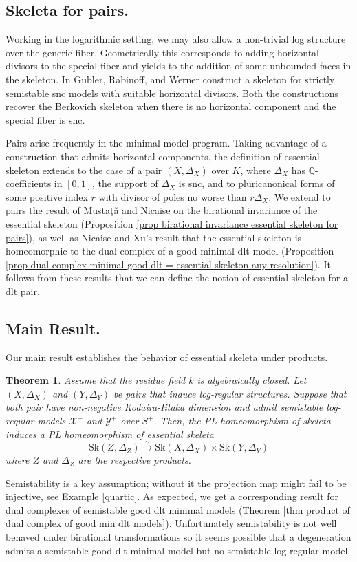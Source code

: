 \documentclass{amsart}%
\numberwithin{equation}{subsection}
\theoremstyle{plain2}
\newtheorem{theorem}[equation]{Theorem}
\theoremstyle{definition2}
\theoremstyle{stepstyle}
\theoremstyle{point}
\theoremstyle{subpoint}
\newcommand{\cX}{\ensuremath{\mathscr{X}}}
\newcommand{\cY}{\ensuremath{\mathscr{Y}}}
\renewcommand{\cY}{\ensuremath{\mathscr{Y}}}
\newcommand{\Sk}{\mathrm{Sk}}
\begin{document}
\subsection{Skeleta for pairs.} Working in the logarithmic setting, we may also allow a non-trivial log structure over the generic fiber. Geometrically this corresponds to adding horizontal divisors to the special fiber and yields to the addition of some unbounded faces in the skeleton. In \cite{GublerRabinoffWerner} Gubler, Rabinoff, and Werner construct a skeleton for strictly semistable snc models with suitable horizontal divisors. Both the constructions recover the Berkovich skeleton when there is no horizontal component and the special fiber is snc.

Pairs arise frequently in the minimal model program. Taking advantage of a construction that admits horizontal components, the definition of essential skeleton extends to the case of a pair $(X,\Delta_X)$ over $K$, where $\Delta_X$ has $\mathbb{Q}$-coefficients in $[0,1]$, the support of $\Delta_X$ is snc, and to pluricanonical forms of some positive index $r$ with divisor of poles no worse than $r\Delta_X$. We extend to pairs the result of Musta{\c{t}}{\u{a}} and Nicaise \cite{MustataNicaise} on the birational invariance of the essential skeleton (Proposition \ref{prop birational invariance essential skeleton for pairs}), as well as Nicaise and Xu's result \cite{NicaiseXu} that the essential skeleton is homeomorphic to the dual complex of a good minimal dlt model (Proposition \ref{prop dual complex minimal good dlt = essential skeleton any resolution}). It follows from these results that we can define the notion of essential skeleton for a dlt pair.

\subsection{Main Result.} Our main result establishes the behavior of essential skeleta under products.
\begin{theorem}\label{main thm intro}Assume that the residue field $k$ is algebraically closed. Let $(X,\Delta_X)$ and $(Y,\Delta_Y)$ be pairs that induce log-regular structures. Suppose that both pair have non-negative Kodaira-Iitaka dimension and admit semistable log-regular models $\cX^+$ and $\cY^+$ over $S^+$. Then, the PL homeomorphism of skeleta induces a PL homeomorphism of essential skeleta $$\Sk(Z,\Delta_Z) \xrightarrow{\sim} \Sk(X,\Delta_X) \times \Sk(Y,\Delta_Y)$$ where $Z$ and $\Delta_Z$ are the respective products. 
\end{theorem}
Semistability is a key assumption; without it the projection map might fail to be injective, see Example \ref{quartic}. As expected, we get a corresponding result for dual complexes of semistable good dlt minimal models (Theorem \ref{thm product of dual complex of good min dlt models}). Unfortunately semistability is not well behaved under birational transformations so it seems possible that a degeneration admits a semistable good dlt minimal model but no semistable log-regular model.
\end{document}
